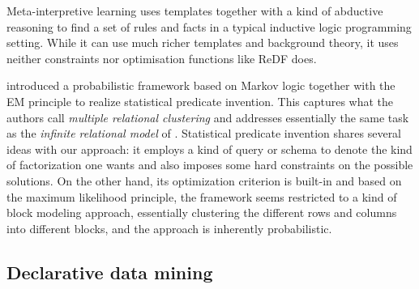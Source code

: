 Meta-interpretive learning \citep{meta_learning} uses templates together with a kind of abductive reasoning
to find a set of rules and facts in a typical inductive logic programming setting. While it can use much richer templates and 
background theory, it uses neither constraints nor optimisation functions like ReDF does.

\citet{predicateinvention} introduced a probabilistic framework based on Markov logic together with the EM principle to realize statistical predicate invention. This captures what the authors call \textit{multiple relational clustering} and addresses essentially the same task as the \textit{infinite relational model} of \citet{conf/aaai/KempTGYU06}.  Statistical predicate invention shares several ideas with our approach:  it employs a kind of query or schema to denote the kind of factorization one wants and also imposes some hard constraints on the possible solutions. On the other hand, its optimization criterion is built-in and based on the maximum likelihood principle, the framework seems restricted to a kind of block modeling approach, essentially clustering the different rows and columns into different blocks, and the approach is inherently probabilistic.  %


\subsection{Declarative data mining} 




